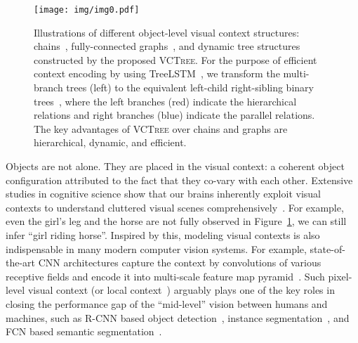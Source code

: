 \documentclass[10pt,twocolumn,letterpaper]{article}
\begin{document}
\begin{figure}[t]
   \begin{minipage}[b]{1.0\linewidth}
   \centerline{\texttt{[image: img/img0.pdf]}}
   \end{minipage}
   \caption{Illustrations of different object-level visual context structures: chains~\cite{zellers2017neural}, fully-connected graphs~\cite{xu2017scene}, and dynamic tree structures constructed by the proposed \textsc{VCTree}. For the purpose of efficient context encoding by using TreeLSTM~\cite{tai2015improved}, we transform the multi-branch trees (left) to the equivalent left-child right-sibling binary trees~\cite{Cormen2001}, where the left branches (red) indicate the hierarchical relations and right branches (blue) indicate the parallel relations. The key advantages of \textsc{VCTree} over chains and graphs are hierarchical, dynamic, and efficient.}
   \vspace{-0.1in}
   \label{fig:1} \end{figure}



Objects are not alone. They are placed in the visual context: a coherent object configuration attributed to the fact that they co-vary with each other. Extensive studies in cognitive science show that our brains inherently exploit visual contexts to understand cluttered visual scenes comprehensively~\cite{bar2004visual, biederman1982scene, oliva2007role}. For example, even the girl's leg and the horse are not fully observed in Figure~\ref{fig:1}, we can still infer ``girl riding horse''. Inspired by this, modeling visual contexts is also indispensable in many modern computer vision systems. For example, state-of-the-art CNN architectures capture the context by convolutions of various receptive fields and encode it into multi-scale feature map pyramid~\cite{chen2018deeplab, lin2017feature, zhao2015saliency}. Such pixel-level visual context (or local context~\cite{divvala2009empirical}) arguably plays one of the key roles in closing the performance gap of the ``mid-level'' vision between humans and machines, such as R-CNN based object detection~\cite{lin2017feature, liu2016ssd, ren2015faster}, instance segmentation~\cite{he2017mask, pinheiro2016learning}, and FCN based semantic segmentation~\cite{chen2018deeplab, chen2017rethinking, yu2015multi}.
\end{document}
